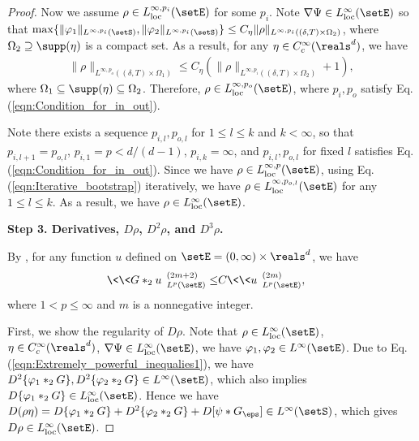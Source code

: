 \documentclass[11pt]{article}
\begin{document}
\begin{proof}
Now we assume $\rho \in L_{\rm loc}^{\infty, p_i}(\setE)$ for some $p_i$. Note $\nabla \Psi \in L_{\rm loc}^\infty(\setE)$ so that $\max\{\| \varphi_1 \|_{L^{\infty, p_i}(\setS)}, \| \varphi_2 \|_{L^{\infty, p_i}(\setS)}\} \le C_\eta \| \rho \|_{L^{\infty, p_i}((\delta, T) \times \Omega_2)}$, where $\Omega_2 \supseteq \supp(\eta)$ is a compact set. As a result, for any $\eta \in C_c^\infty(\reals^d)$, we have
\begin{align}\label{eqn:Iterative_bootstrap}
\| \rho \|_{L^{\infty, p_o}((\delta, T) \times \Omega_1)} \le C_\eta (\| \rho \|_{L^{\infty, p_i}((\delta, T) \times \Omega_2)} + 1),
\end{align}
where $\Omega_1 \subseteq \supp(\eta) \subseteq \Omega_2$. Therefore, $\rho \in L_{\rm loc}^{\infty, p_o}(\setE)$, where $p_i, p_o$ satisfy Eq. (\ref{eqn:Condition_for_in_out}). 

Note there exists a sequence $p_{i, l}, p_{o, l}$ for $1 \le l \le k$ and $k < \infty$, so that $p_{i, l+1} = p_{o, l}$, $p_{i, 1} = p<d/(d-1)$, $p_{i, k} = \infty$, and $p_{i, l}, p_{o, l}$ for fixed $l$ satisfies Eq. (\ref{eqn:Condition_for_in_out}). Since we have $\rho \in L^{\infty, p}_{\rm loc}(\setE)$, using Eq. (\ref{eqn:Iterative_bootstrap}) iteratively, we have $\rho \in L^{\infty, p_{o, l}}_{\rm loc}(\setE)$ for any $1 \le l \le k$. As a result, we have $\rho \in L^{\infty}_{\rm loc}(\setE)$. 

\noindent
{\bf Step 3. Derivatives, $D\rho$, $D^2 \rho$, and $D^3 \rho$.}

By \cite[Chapter IV, section 3, (3.1)]{ladyzhenskaia1988linear}, for any function $u$ defined on $\setE = (0, \infty) \times \reals^d$, we have
\begin{align}
\< \< G *_2 u \>\>_{L^p(\setE)}^{(2m+2)} \le& C \< \< u \> \>_{L^p(\setE)}^{(2m)}, \label{eqn:Extremely_powerful_inequalies1}
\end{align}
where $1 < p \le \infty$ and $m$ is a nonnegative integer. 

First, we show the regularity of $D \rho$. Note that $\rho \in L^\infty_{\rm loc}(\setE)$, $\eta \in C_c^\infty(\reals^d)$, $\nabla \Psi \in L_{\rm loc}^\infty(\setE)$, we have $\varphi_1, \varphi_2 \in L^\infty(\setE)$. Due to Eq. (\ref{eqn:Extremely_powerful_inequalies1}), we have $D^2 \{\varphi_1 *_2 G\}, D^2\{ \varphi_2 *_2 G \} \in L^\infty(\setE)$, which also implies $D \{\varphi_1 *_2 G\} \in L^\infty_{\rm loc}(\setE)$. Hence we have $D (\rho \eta) = D \{\varphi_1 *_2 G\} + D^2\{ \varphi_2 *_2 G \}  +  D [\psi * G_\eps] \in L^\infty(\setS)$, which gives $D \rho \in L^\infty_{\rm loc}(\setE)$. 


\end{proof}
\end{document}
